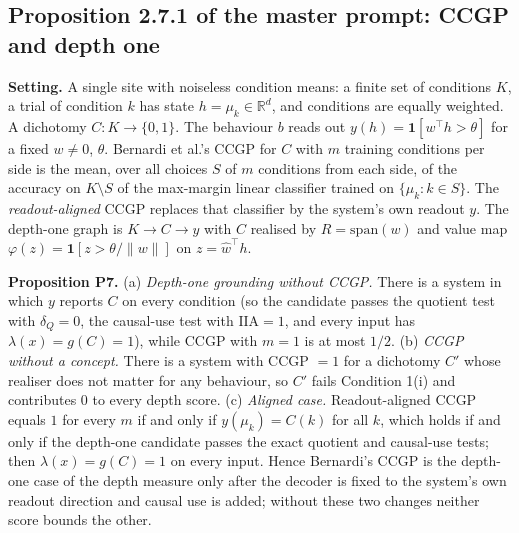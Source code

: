 \subsection{Proposition 2.7.1 of the master prompt: CCGP and depth one}
\label{proof:P7}
\textbf{Setting.} A single site with noiseless condition means: a finite set
of conditions $K$, a trial of condition $k$ has state $h=\mu_k\in\mathbb{R}^d$,
and conditions are equally weighted. A dichotomy $C\colon K\to\{0,1\}$. The
behaviour $b$ reads out $y(h)=\mathbf{1}[w^\top h>\theta]$ for a fixed
$w\ne0$, $\theta$. Bernardi et al.'s CCGP for $C$ with $m$ training conditions
per side is the mean, over all choices $S$ of $m$ conditions from each side,
of the accuracy on $K\setminus S$ of the max-margin linear classifier trained
on $\{\mu_k:k\in S\}$. The \emph{readout-aligned} CCGP replaces that
classifier by the system's own readout $y$. The depth-one graph is
$K\to C\to y$ with $C$ realised by $R=\mathrm{span}(w)$ and value map
$\varphi(z)=\mathbf{1}[z>\theta/\lVert w\rVert]$ on $z=\hat w^\top h$.

\textbf{Proposition P7.} (a) \emph{Depth-one grounding without CCGP.} There
is a system in which $y$ reports $C$ on every condition (so the candidate
passes the quotient test with $\delta_Q=0$, the causal-use test with
$\mathrm{IIA}=1$, and every input has $\lambda(x)=g(C)=1$), while CCGP with
$m=1$ is at most $1/2$.
(b) \emph{CCGP without a concept.} There is a system with CCGP $=1$ for a
dichotomy $C'$ whose realiser does not matter for any behaviour, so $C'$ fails
Condition 1(i) and contributes $0$ to every depth score.
(c) \emph{Aligned case.} Readout-aligned CCGP equals $1$ for every $m$ if and
only if $y(\mu_k)=C(k)$ for all $k$, which holds if and only if the depth-one
candidate passes the exact quotient and causal-use tests; then $\lambda(x)=g(C)=1$
on every input.
Hence Bernardi's CCGP is the depth-one case of the depth measure only after
the decoder is fixed to the system's own readout direction and causal use is
added; without these two changes neither score bounds the other.


